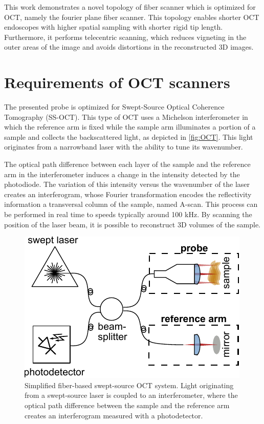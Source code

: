 \documentclass[10pt]{iopart}
\begin{document}
This work demonstrates a novel topology of fiber scanner which is optimized for OCT, namely the fourier plane fiber scanner. This topology enables shorter OCT endoscopes with higher spatial sampling with shorter rigid tip length. Furthermore, it performs telecentric scanning, which reduces vigneting in the outer areas of the image and avoids distortions in the reconstructed 3D images.


\section{Requirements of OCT scanners}

The presented probe is optimized for Swept-Source Optical Coherence Tomography (SS-OCT). This type of OCT uses a Michelson interferometer in which the reference arm is fixed while the sample arm illuminates a portion of a sample and collects the backscattered light, as depicted in \autoref{fig:OCT}. This light originates from a narrowband laser with the ability to tune its wavenumber. 


The optical path difference between each layer of the sample and the reference arm in the interferometer induces a change in the intensity detected by the photodiode. The variation of this intensity versus the wavenumber of the laser creates an interferogram, whose Fourier transformation encodes the reflectivity information a transversal column of the sample, named A-scan. This process can be performed in real time to speeds typically around 100 kHz. By scanning the position of the laser beam, it is possible to reconstruct 3D volumes of the sample.

\begin{figure}[h!]\centering \includegraphics{figures/OCTsetup.pdf}
      \caption{Simplified fiber-based swept-source OCT system. Light originating from a swept-source laser is coupled to an interferometer, where the optical path difference between the sample and the reference arm creates an interferogram measured with a photodetector.}
      \label{fig:OCT}
\end{figure}
\end{document}
